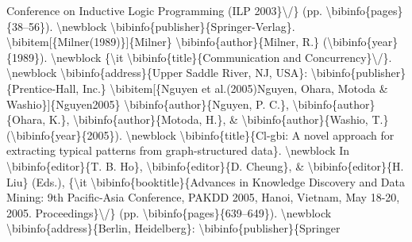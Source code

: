 \documentclass{article}%
\begin{document}
Conference on Inductive Logic Programming (ILP 2003\}\textbackslash{}/\} (pp.\newline%
\textbackslash{}bibinfo\{pages\}\{38–56\}).\newline%
\textbackslash{}newblock \textbackslash{}bibinfo\{publisher\}\{Springer{-}Verlag\}.\newline%
\textbackslash{}bibitem{[}\{Milner(1989)\}{]}\{Milner\}\newline%
\textbackslash{}bibinfo\{author\}\{Milner, R.\} (\textbackslash{}bibinfo\{year\}\{1989\}).\newline%
\textbackslash{}newblock \{\textbackslash{}it \textbackslash{}bibinfo\{title\}\{Communication and Concurrency\}\textbackslash{}/\}.\newline%
\textbackslash{}newblock \textbackslash{}bibinfo\{address\}\{Upper Saddle River, NJ, USA\}:\newline%
\textbackslash{}bibinfo\{publisher\}\{Prentice{-}Hall, Inc.\}\newline%
\textbackslash{}bibitem{[}\{Nguyen et al.(2005)Nguyen, Ohara, Motoda \& Washio\}{]}\{Nguyen2005\}\newline%
\textbackslash{}bibinfo\{author\}\{Nguyen, P. C.\}, \textbackslash{}bibinfo\{author\}\{Ohara, K.\},\newline%
\textbackslash{}bibinfo\{author\}\{Motoda, H.\}, \& \textbackslash{}bibinfo\{author\}\{Washio, T.\}\newline%
(\textbackslash{}bibinfo\{year\}\{2005\}).\newline%
\textbackslash{}newblock \textbackslash{}bibinfo\{title\}\{Cl{-}gbi: A novel approach for extracting typical\newline%
patterns from graph{-}structured data\}.\newline%
\textbackslash{}newblock In \textbackslash{}bibinfo\{editor\}\{T. B. Ho\}, \textbackslash{}bibinfo\{editor\}\{D. Cheung\}, \&\newline%
\textbackslash{}bibinfo\{editor\}\{H. Liu\} (Eds.), \{\textbackslash{}it \textbackslash{}bibinfo\{booktitle\}\{Advances in\newline%
Knowledge Discovery and Data Mining: 9th Pacific{-}Asia Conference, PAKDD 2005,\newline%
Hanoi, Vietnam, May 18{-}20, 2005. Proceedings\}\textbackslash{}/\} (pp.\newline%
\textbackslash{}bibinfo\{pages\}\{639–649\}).\newline%
\textbackslash{}newblock \textbackslash{}bibinfo\{address\}\{Berlin, Heidelberg\}: \textbackslash{}bibinfo\{publisher\}\{Springer\newline%
\end{document}
